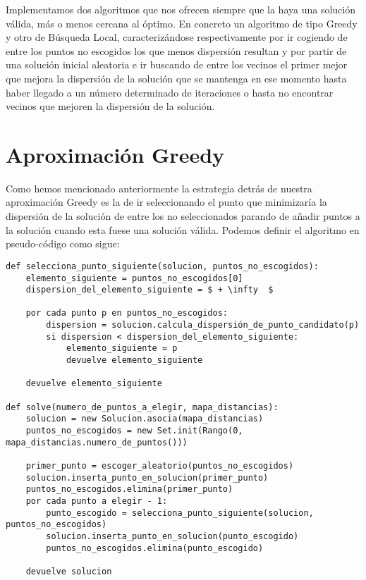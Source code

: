 Implementamos dos algoritmos que nos ofrecen siempre que la haya una solución válida, más o menos cercana al óptimo.
En concreto un algoritmo de tipo Greedy y otro de Búsqueda Local, caracterizándose respectivamente por ir cogiendo de entre
los puntos no escogidos los que menos dispersión resultan y por partir de una solución inicial aleatoria e ir buscando de
entre los vecinos el primer mejor que mejora la dispersión de la solución que se mantenga en ese momento hasta haber llegado
a un número determinado de iteraciones o hasta no encontrar vecinos que mejoren la dispersión de la solución.

\section{Aproximación Greedy}

Como hemos mencionado anteriormente la estrategia detrás de nuestra aproximación Greedy es la de ir seleccionando
el punto que minimizaría la dispersión de la solución de entre los no seleccionados parando de añadir puntos a la
solución cuando esta fuese una solución válida. Podemos definir el algoritmo en pseudo-código como sigue:

\begin{minipage}{\textwidth}
\begin{lstlisting}[mathescape=true,caption={Definición del algoritmo Greedy.},captionpos=b]
def selecciona_punto_siguiente(solucion, puntos_no_escogidos):
    elemento_siguiente = puntos_no_escogidos[0]
    dispersion_del_elemento_siguiente = $ + \infty  $
    
    por cada punto p en puntos_no_escogidos:
        dispersion = solucion.calcula_dispersión_de_punto_candidato(p)
        si dispersion < dispersion_del_elemento_siguiente:
            elemento_siguiente = p
            devuelve elemento_siguiente
    
    devuelve elemento_siguiente

def solve(numero_de_puntos_a_elegir, mapa_distancias):
    solucion = new Solucion.asocia(mapa_distancias)
    puntos_no_escogidos = new Set.init(Rango(0, mapa_distancias.numero_de_puntos()))

    primer_punto = escoger_aleatorio(puntos_no_escogidos)
    solucion.inserta_punto_en_solucion(primer_punto)
    puntos_no_escogidos.elimina(primer_punto)
    por cada punto a elegir - 1:
        punto_escogido = selecciona_punto_siguiente(solucion, puntos_no_escogidos)
        solucion.inserta_punto_en_solucion(punto_escogido)
        puntos_no_escogidos.elimina(punto_escogido)
    
    devuelve solucion
\end{lstlisting}
\end{minipage}

